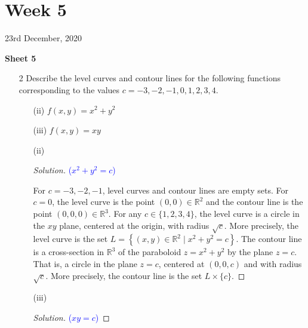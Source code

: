 \documentclass[12pt]{article}
\theoremstyle{definition}
\newenvironment{soln}{\begin{proof}[Solution]}{\end{proof}}
\begin{document}
\newpage
\section{Week 5}
\begin{center}
    23rd December, 2020
\end{center}

\textbf{Sheet 5}

\begin{enumerate}[leftmargin=*]
    \itemsep0.5em
    \item[2] Describe the level curves and contour lines for the following functions corresponding to the values $c=-3,-2,-1,0,1,2,3,4$.
    \begin{multicols}{2}
        \begin{enumerate}[leftmargin=*]
            \item[(ii)] $f(x,y) = x^2 + y^2$
            \item[(iii)] $f(x,y) = xy$
        \end{enumerate}
    \end{multicols}
    
    \begin{enumerate}[leftmargin=*]
        \item[(ii)] \begin{soln} \textcolor{blue}{($x^2 + y^2 = c$)}
        
            For $c=-3,-2,-1$, level curves and contour lines are empty sets. For $c=0$, the level curve is the point $(0,0) \in \mathbb{R}^2$ and the contour line is the point $(0,0,0) \in \mathbb{R}^3$. For any $c \in \{1,2,3,4\}$, the level curve is a circle in the $xy$ plane, centered at the origin, with radius $\sqrt{c}$. More precisely, the level curve is the set $L = \left\{ (x,y) \in \mathbb{R}^2 \mid x^2 + y^2 = c \right\}$. The contour line is a cross-section in $\mathbb{R}^3$ of the paraboloid $z = x^2 + y^2$ by the plane $z=c$. That is, a circle in the plane $z=c$, centered at $(0,0,c)$ and with radius $\sqrt{c}$. More precisely, the contour line is the set $L \times \{c\}$.
        \end{soln}
        
        \item[(iii)] \begin{soln}\textcolor{blue}{($xy=c$)}
        
            

\end{soln}
\end{enumerate}
\end{enumerate}
\end{document}
